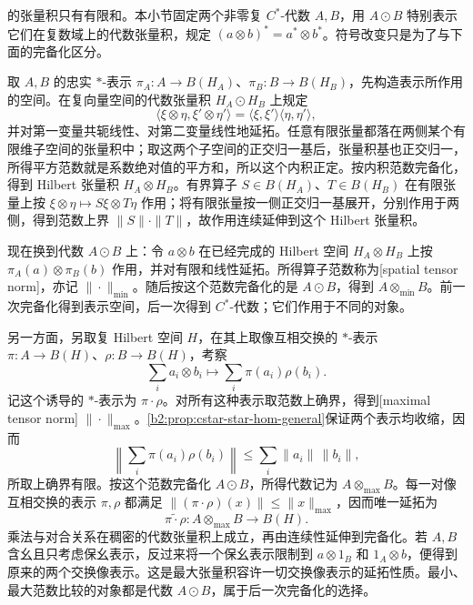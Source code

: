 的张量积只有有限和。本小节固定两个非零复 \(C^*\)-代数 \(A,B\)，用 \(A\odot B\) 特别表示它们在复数域上的代数张量积，规定 \((a\otimes b)^*=a^*\otimes b^*\)。符号改变只是为了与下面的完备化区分。

\ProseParagraphBreak
取 \(A,B\) 的忠实 \(*\)-表示 \(\pi_A:A\to B(H_A)\)、\(\pi_B:B\to B(H_B)\)，先构造表示所作用的空间。在复向量空间的代数张量积 \(H_A\odot H_B\) 上规定
\[
	\langle\xi\otimes\eta,\xi'\otimes\eta'\rangle =\langle\xi,\xi'\rangle\langle\eta,\eta'\rangle,
\]
并对第一变量共轭线性、对第二变量线性地延拓。任意有限张量都落在两侧某个有限维子空间的张量积中；取这两个子空间的正交归一基后，张量积基也正交归一，所得平方范数就是系数绝对值的平方和，所以这个内积正定。按内积范数完备化，得到 Hilbert 张量积 \(H_A\otimes H_B\)。有界算子 \(S\in B(H_A)\)、\(T\in B(H_B)\) 在有限张量上按 \(\xi\otimes\eta\mapsto S\xi\otimes T\eta\) 作用；将有限张量按一侧正交归一基展开，分别作用于两侧，得到范数上界 \(\|S\|\cdot\|T\|\)，故作用连续延伸到这个 Hilbert 张量积。

\ProseParagraphBreak
现在换到代数 \(A\odot B\) 上：令 \(a\otimes b\) 在已经完成的 Hilbert 空间 \(H_A\otimes H_B\) 上按 \(\pi_A(a)\otimes\pi_B(b)\) 作用，并对有限和线性延拓。所得算子范数称为[spatial tensor norm]，亦记 \(\|\cdot\|_{\min}\)。随后按这个范数完备化的是 \(A\odot B\)，得到 \(A\otimes_{\min}B\)。前一次完备化得到表示空间，后一次得到 \(C^*\)-代数；它们作用于不同的对象。

\ProseParagraphBreak
另一方面，另取复 Hilbert 空间 \(H\)，在其上取像互相交换的 \(*\)-表示 \(\pi:A\to B(H)\)、\(\rho:B\to B(H)\)，考察
\[
	\sum_i a_i\otimes b_i\longmapsto\sum_i\pi(a_i)\rho(b_i).
\]
记这个诱导的 \(*\)-表示为 \(\pi\cdot\rho\)。对所有这种表示取范数上确界，得到[maximal tensor norm] \(\|\cdot\|_{\max}\)。\cref{b2:prop:cstar-star-hom-general}保证两个表示均收缩，因而
\[
	\left\|\sum_i\pi(a_i)\rho(b_i)\right\| \le\sum_i\|a_i\|\,\|b_i\|,
\]
所取上确界有限。按这个范数完备化 \(A\odot B\)，所得代数记为 \(A\otimes_{\max}B\)。每一对像互相交换的表示 \(\pi,\rho\) 都满足 \(\| (\pi\cdot\rho)(x)\|\le\|x\|_{\max}\)，因而唯一延拓为
\[
	\widetilde{\pi\cdot\rho}:A\otimes_{\max}B\longrightarrow B(H).
\]
乘法与对合关系在稠密的代数张量积上成立，再由连续性延伸到完备化。若 \(A,B\) 含幺且只考虑保幺表示，反过来将一个保幺表示限制到 \(a\otimes1_B\) 和 \(1_A\otimes b\)，便得到原来的两个交换像表示。这是最大张量积容许一切交换像表示的延拓性质。最小、最大范数比较的对象都是代数 \(A\odot B\)，属于后一次完备化的选择。

